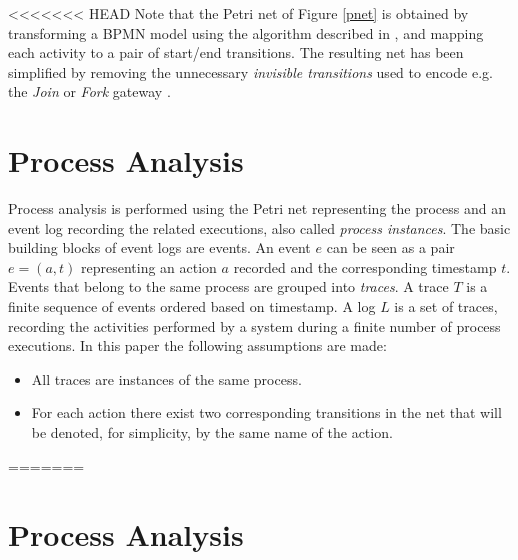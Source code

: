 \documentclass{llncs}
\begin{document}
<<<<<<< HEAD
Note that the Petri net of Figure \ref{pnet} is obtained by transforming a BPMN model using the algorithm described in \cite{2}, and mapping each activity to a pair of start/end transitions. The resulting net has been simplified by removing the unnecessary \emph{invisible transitions} used to encode e.g. the \emph{Join} or \emph{Fork} gateway \cite{2}.

\section{Process Analysis}\label{Background}
Process analysis is performed using the Petri net representing the process and an event log recording the related executions, also called \emph{process instances}. The basic building blocks of event logs are events. An event $e$ can be seen as a pair $e = (a,t)$ representing an action $a$ recorded and the corresponding timestamp $t$.  Events that belong to the same process are grouped into {\itshape traces}. A trace $T$ is a finite sequence of events ordered based on timestamp. A log $L$ is a set of traces, recording the activities performed by a system during a finite number of process executions.  In this paper the following assumptions are made:
\begin{itemize}
\item All traces are instances of the same process.
\item For each action there exist two corresponding transitions in the net that will be denoted, for simplicity, by the same name of the action.
\end{itemize}
=======

\section{Process Analysis}\label{Background}
\end{document}
